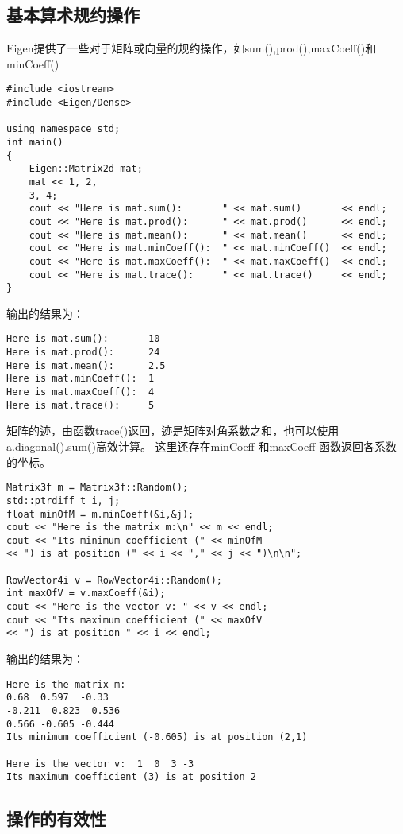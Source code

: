 \subsection{基本算术规约操作}

Eigen提供了一些对于矩阵或向量的规约操作，如sum(),prod(),maxCoeff()和minCoeff()

\begin{lstlisting}[style=Cpp]
#include <iostream>
#include <Eigen/Dense>

using namespace std;
int main()
{
	Eigen::Matrix2d mat;
	mat << 1, 2,
	3, 4;
	cout << "Here is mat.sum():       " << mat.sum()       << endl;
	cout << "Here is mat.prod():      " << mat.prod()      << endl;
	cout << "Here is mat.mean():      " << mat.mean()      << endl;
	cout << "Here is mat.minCoeff():  " << mat.minCoeff()  << endl;
	cout << "Here is mat.maxCoeff():  " << mat.maxCoeff()  << endl;
	cout << "Here is mat.trace():     " << mat.trace()     << endl;
}
\end{lstlisting}
输出的结果为：
\begin{lstlisting}
Here is mat.sum():       10
Here is mat.prod():      24
Here is mat.mean():      2.5
Here is mat.minCoeff():  1
Here is mat.maxCoeff():  4
Here is mat.trace():     5
\end{lstlisting}

矩阵的迹，由函数trace()返回，迹是矩阵对角系数之和，也可以使用a.diagonal().sum()高效计算。
这里还存在minCoeff 和maxCoeff 函数返回各系数的坐标。

\begin{lstlisting}[style=Cpp]
Matrix3f m = Matrix3f::Random();
std::ptrdiff_t i, j;
float minOfM = m.minCoeff(&i,&j);
cout << "Here is the matrix m:\n" << m << endl;
cout << "Its minimum coefficient (" << minOfM 
<< ") is at position (" << i << "," << j << ")\n\n";

RowVector4i v = RowVector4i::Random();
int maxOfV = v.maxCoeff(&i);
cout << "Here is the vector v: " << v << endl;
cout << "Its maximum coefficient (" << maxOfV 
<< ") is at position " << i << endl;
\end{lstlisting}
输出的结果为：
\begin{lstlisting}
Here is the matrix m:
0.68  0.597  -0.33
-0.211  0.823  0.536
0.566 -0.605 -0.444
Its minimum coefficient (-0.605) is at position (2,1)

Here is the vector v:  1  0  3 -3
Its maximum coefficient (3) is at position 2
\end{lstlisting}

\subsection{操作的有效性}

